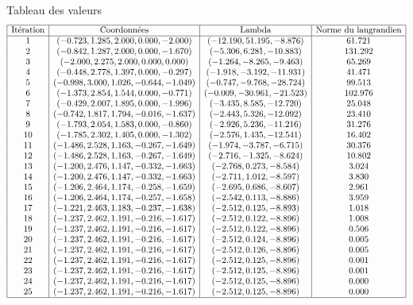 \documentclass[a4paper,20pt]{article}
\begin{document}
Tableau des valeurs
$$
\begin{array}{|c|c|c|c|}
\hline
\text{It\'eration} & \text{Coordonn\'ees} & \text{Lambda} & \text{Norme du langrandien} \\
\hline
1 & (-0.723, 1.285, 2.000, 0.000, -2.000) & (-12.190, 51.195, -8.876) & 61.721 \\
2 & (-0.842, 1.287, 2.000, 0.000, -1.670) & (-5.306, 6.281, -10.883) & 131.292 \\
3 & (-2.000, 2.275, 2.000, 0.000, 0.000) & (-1.264, -8.265, -9.463) & 65.269 \\
4 & (-0.448, 2.778, 1.397, 0.000, -0.297) & (-1.918, -3.192, -11.931) & 41.471 \\
5 & (-0.998, 3.000, 1.026, -0.644, -1.049) & (-0.747, -9.768, -28.724) & 99.513 \\
6 & (-1.373, 2.854, 1.544, 0.000, -0.771) & (-0.009, -30.961, -21.523) & 102.976 \\
7 & (-0.429, 2.007, 1.895, 0.000, -1.996) & (-3.435, 8.585, -12.720) & 25.048 \\
8 & (-0.742, 1.817, 1.794, -0.016, -1.637) & (-2.443, 5.326, -12.092) & 23.410 \\
9 & (-1.793, 2.054, 1.583, 0.000, -0.860) & (-2.926, 5.236, -11.216) & 31.276 \\
10 & (-1.785, 2.302, 1.405, 0.000, -1.302) & (-2.576, 1.435, -12.541) & 16.402 \\
11 & (-1.486, 2.528, 1.163, -0.267, -1.649) & (-1.974, -3.787, -6.715) & 30.376 \\
12 & (-1.486, 2.528, 1.163, -0.267, -1.649) & (-2.716, -1.325, -8.624) & 10.802 \\
13 & (-1.200, 2.476, 1.147, -0.332, -1.663) & (-2.768, 0.273, -8.584) & 3.024 \\
14 & (-1.200, 2.476, 1.147, -0.332, -1.663) & (-2.711, 1.012, -8.597) & 3.830 \\
15 & (-1.206, 2.464, 1.174, -0.258, -1.659) & (-2.695, 0.686, -8.607) & 2.961 \\
16 & (-1.206, 2.464, 1.174, -0.257, -1.658) & (-2.542, 0.113, -8.886) & 3.959 \\
17 & (-1.221, 2.463, 1.183, -0.237, -1.638) & (-2.512, 0.125, -8.893) & 1.018 \\
18 & (-1.237, 2.462, 1.191, -0.216, -1.617) & (-2.512, 0.122, -8.896) & 1.008 \\
19 & (-1.237, 2.462, 1.191, -0.216, -1.617) & (-2.512, 0.122, -8.896) & 0.506 \\
20 & (-1.237, 2.462, 1.191, -0.216, -1.617) & (-2.512, 0.124, -8.896) & 0.005 \\
21 & (-1.237, 2.462, 1.191, -0.216, -1.617) & (-2.512, 0.126, -8.896) & 0.005 \\
22 & (-1.237, 2.462, 1.191, -0.216, -1.617) & (-2.512, 0.125, -8.896) & 0.001 \\
23 & (-1.237, 2.462, 1.191, -0.216, -1.617) & (-2.512, 0.125, -8.896) & 0.001 \\
24 & (-1.237, 2.462, 1.191, -0.216, -1.617) & (-2.512, 0.125, -8.896) & 0.000 \\
25 & (-1.237, 2.462, 1.191, -0.216, -1.617) & (-2.512, 0.125, -8.896) & 0.000 \\
\hline
\end{array}
$$
\end{document}
